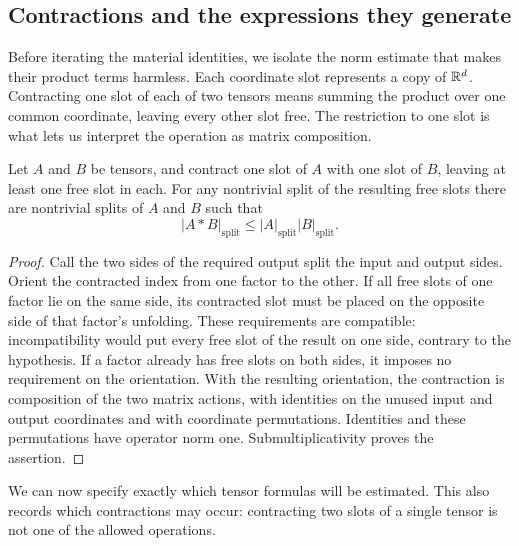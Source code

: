 \subsection{Contractions and the expressions they generate}

Before iterating the material identities, we isolate the norm estimate
that makes their product terms harmless.  Each coordinate slot represents
a copy of $\mathbb R^d$.  Contracting one slot of each of two tensors means
summing the product over one common coordinate, leaving every other
slot free.  The restriction to one slot is what lets us interpret the
operation as matrix composition.

\begin{lemma}
\label{lem:split-contraction}
Let $A$ and $B$ be tensors, and contract one slot of $A$ with one slot
of $B$, leaving at least one free slot in each.  For any nontrivial
split of the resulting free slots there are nontrivial splits of $A$
and $B$ such that
\[
 |A*B|_{\mathrm{split}}
 \le |A|_{\mathrm{split}}|B|_{\mathrm{split}}.
\]
\end{lemma}

\begin{proof}
Call the two sides of the required output split the input and output
sides.  Orient the contracted index from one factor to the other.
If all free slots of one factor lie on the same side, its contracted
slot must be placed on the opposite side of that factor's unfolding.
These requirements are compatible: incompatibility would put every
free slot of the result on one side, contrary to the hypothesis.
If a factor already has free slots on both sides, it imposes no
requirement on the orientation.  With the resulting orientation, the
contraction is composition of the two matrix actions, with identities
on the unused input and output coordinates and with coordinate
permutations.  Identities and these permutations have operator norm
one.  Submultiplicativity proves the assertion.
\end{proof}

We can now specify exactly which tensor formulas will be estimated.
This also records which contractions may occur: contracting two slots
of a single tensor is not one of the allowed operations.

